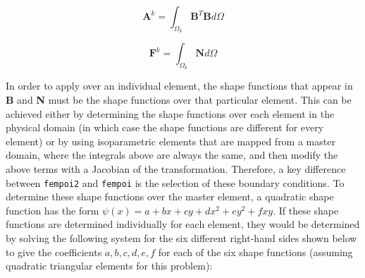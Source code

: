 \documentclass[10pt]{article}
\newcommand{\beq}{\begin{equation}}
\newcommand{\eeq}{\end{equation}}
\begin{document}
\beq
\label{eq:20}
\textbf{A}^k=\int_{\Omega_k} \textbf{B}^T\textbf{B}d\Omega
\eeq

\beq
\label{eq:21}
\textbf{F}^k=\int_{\Omega_k} \textbf{N}d\Omega
\eeq

In order to apply over an individual element, the shape functions that appear in \textbf{B} and \textbf{N} must be the shape functions over that particular element. This can be achieved either by determining the shape functions over each element in the physical domain (in which case the shape functions are different for every element) or by using isoparametric elements that are mapped from a master domain, where the integrals above are always the same, and then modify the above terms with a Jacobian of the transformation. Therefore, a key difference between {\tt fempoi2} and {\tt fempoi} is the selection of these boundary conditions. To determine these shape functions over the master element, a quadratic shape function has the form \(\psi(x)=a+bx+cy+dx^2+ey^2+fxy\). If these shape functions are determined individually for each element, they would be determined by solving the following system for the six different right-hand sides shown below to give the coefficients \(a, b, c, d, e, f\) for each of the six shape functions (assuming quadratic triangular elements for this problem):
\end{document}
